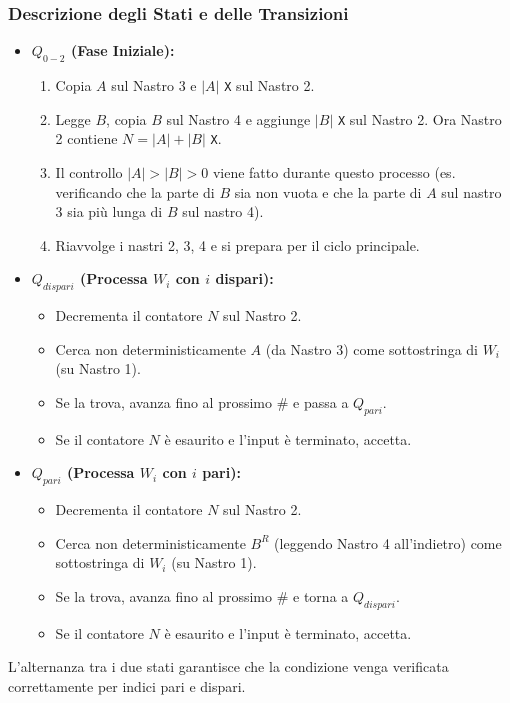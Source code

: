 \documentclass[a4paper]{article}
\newcommand{\Sh}{\texttt{\#}} %
\begin{document}
\subsubsection{Descrizione degli Stati e delle Transizioni}
\begin{itemize}
    \item \textbf{$Q_{0-2}$ (Fase Iniziale):}
        \begin{enumerate}
            \item Copia $A$ sul Nastro 3 e $|A|$ \texttt{X} sul Nastro 2.
            \item Legge $B$, copia $B$ sul Nastro 4 e aggiunge $|B|$ \texttt{X} sul Nastro 2. Ora Nastro 2 contiene $N=|A|+|B|$ \texttt{X}.
            \item Il controllo $|A|>|B|>0$ viene fatto durante questo processo (es. verificando che la parte di $B$ sia non vuota e che la parte di $A$ sul nastro 3 sia più lunga di $B$ sul nastro 4).
            \item Riavvolge i nastri 2, 3, 4 e si prepara per il ciclo principale.
        \end{enumerate}
    \item \textbf{$Q_{dispari}$ (Processa $W_i$ con $i$ dispari):}
        \begin{itemize}
            \item Decrementa il contatore $N$ sul Nastro 2.
            \item Cerca non deterministicamente $A$ (da Nastro 3) come sottostringa di $W_i$ (su Nastro 1).
            \item Se la trova, avanza fino al prossimo $\Sh$ e passa a $Q_{pari}$.
            \item Se il contatore $N$ è esaurito e l'input è terminato, accetta.
        \end{itemize}
    \item \textbf{$Q_{pari}$ (Processa $W_i$ con $i$ pari):}
        \begin{itemize}
            \item Decrementa il contatore $N$ sul Nastro 2.
            \item Cerca non deterministicamente $B^R$ (leggendo Nastro 4 all'indietro) come sottostringa di $W_i$ (su Nastro 1).
            \item Se la trova, avanza fino al prossimo $\Sh$ e torna a $Q_{dispari}$.
            \item Se il contatore $N$ è esaurito e l'input è terminato, accetta.
        \end{itemize}
\end{itemize}
L'alternanza tra i due stati garantisce che la condizione venga verificata correttamente per indici pari e dispari.
\end{document}
